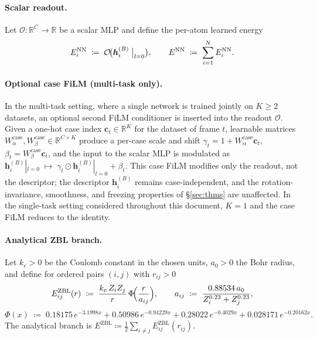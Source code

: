 \documentclass[11pt,a4paper]{article}
\newcommand{\R}{\mathbb{R}}
\newcommand{\bh}{\bm{h}}
\theoremstyle{plain}
\theoremstyle{definition}
\theoremstyle{remark}
\begin{document}
\paragraph{Scalar readout.}
Let $\mathcal{O}:\R^{C}\to\R$ be a scalar MLP and define the per-atom learned
energy
\begin{equation}\label{eq:Ei}
    E_i^{\mathrm{NN}}\;\coloneqq\;\mathcal{O}\!\bigl(\bh_i^{(B)}\bigm|_{l=0}\bigr),\qquad
    E^{\mathrm{NN}}\;\coloneqq\;\sum_{i=1}^{N}E_i^{\mathrm{NN}}.
\end{equation}

\paragraph{Optional case FiLM (multi-task only).}
In the multi-task setting, where a single network is trained jointly on $K\geq
    2$ datasets, an optional second FiLM conditioner is inserted into the readout
$\mathcal{O}$. Given a one-hot case index $\bm{c}_t\in\R^{K}$ for the dataset
of frame $t$, learnable matrices
$W_\alpha^{\mathrm{case}},W_\beta^{\mathrm{case}}\in\R^{C\times K}$ produce a
per-case scale and shift $\gamma_t=1+W_\alpha^{\mathrm{case}}\bm{c}_t$,
$\beta_t=W_\beta^{\mathrm{case}}\bm{c}_t$, and the input to the scalar MLP is
modulated as $\bh_i^{(B)}|_{l=0}\;\mapsto\;\gamma_t\odot
    \bh_i^{(B)}|_{l=0}+\beta_t$. This case FiLM modifies only the readout, not the
descriptor; the descriptor $\bh_i^{(B)}$ remains case-independent, and the
rotation-invariance, smoothness, and freezing properties of \S\ref{sec:thms}
are unaffected. In the single-task setting considered throughout this document,
$K=1$ and the case FiLM reduces to the identity.

\paragraph{Analytical ZBL branch.}\label{sec:zbl}
Let $k_e>0$ be the Coulomb constant in the chosen units, $a_0>0$ the Bohr
radius, and define for ordered pairs $(i,j)$ with $r_{ij}>0$
\begin{equation}\label{eq:zbl}
    E_{ij}^{\mathrm{ZBL}}(r)\;\coloneqq\;\frac{k_e\,Z_iZ_j}{r}\,\Phi\!\Bigl(\frac{r}{a_{ij}}\Bigr),\qquad
    a_{ij}\;\coloneqq\;\frac{0.88534\,a_0}{Z_i^{0.23}+Z_j^{0.23}},
\end{equation}
\begin{equation}\label{eq:zbl-Phi}
    \Phi(x)\;\coloneqq\;0.18175\,e^{-3.1998x}+0.50986\,e^{-0.94229x}+0.28022\,e^{-0.4029x}+0.028171\,e^{-0.20162x}.
\end{equation}
The analytical branch is $E^{\mathrm{ZBL}}\coloneqq\tfrac{1}{2}\sum_{i\neq j}E_{ij}^{\mathrm{ZBL}}(r_{ij})$.
\end{document}
